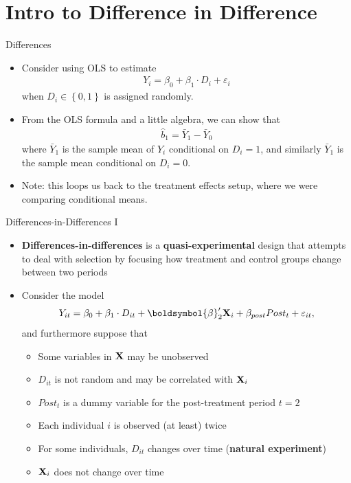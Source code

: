 \documentclass[aspectratio=169,11pt]{beamer}
\begin{document}
\section{Intro to Difference in Difference}


\begin{frame}{Differences}
\begin{itemize}
  \item Consider using OLS to estimate
  \begin{align*}
  Y_{i}=\beta_{0}+\beta_{1}\cdot D_{i}+ \varepsilon_{i}
  \end{align*}
  when $D_i \in \left\{ 0,1\right\}$ is assigned randomly.

  \medskip
  \item From the OLS formula and a little algebra, we can show that
  \begin{align*}
  \hat{b}_1 = \bar{Y}_{1} - \bar{Y}_{0}
  \end{align*}
  where $\bar{Y}_{1}$ is the sample mean of $Y_i$ conditional on
  $D_i = 1$, and similarly $\bar{Y}_{1}$ is the sample mean conditional on $D_i = 0$.

  \medskip
  \item Note: this loops us back to the treatment effects setup, where
  we were comparing conditional means.

\end{itemize}
\end{frame}



\begin{frame}{Differences-in-Differences I}
\begin{itemize}
  \item {\bf Differences-in-differences} is a {\bf quasi-experimental} design
  that attempts to deal with selection by focusing how treatment and control
  groups change between two periods

  \smallskip
  \item Consider the model  
  \begin{align*}
  Y_{it}=\beta_{0}+\beta_{1} \cdot D_{it}+\boldsymbol{\beta}_2' {\bf X}_{i}+ \beta_{post}  Post_t  + \varepsilon_{it},
  \end{align*}
  and furthermore suppose that
  \begin{itemize}
    \item Some variables in ${\bf X}$ may be unobserved
    \item $D_{it}$ is not random and may be correlated with ${\bf X}_{i}$
    \item $Post_t$ is a dummy variable for the post-treatment period $t=2$
    \item Each individual $i$ is observed (at least) twice
    \item For some individuals, $D_{it}$ changes over time ({\bf natural experiment})
    \item ${\bf X}_{i}$ does not change over time
  \end{itemize}

\end{itemize}
\end{frame}
\end{document}
